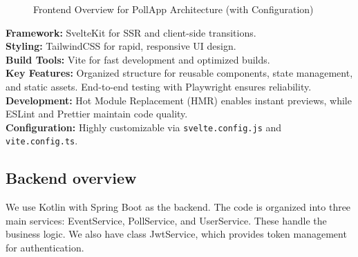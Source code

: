 \begin{figure}[H]
{
}
\caption{Frontend Overview for PollApp Architecture (with Configuration)}
\label{fig:frontend_overview_with_configuration}
\end{figure}



\noindent \textbf{Framework:} SvelteKit for SSR and client-side transitions. \\
\noindent \textbf{Styling:} TailwindCSS for rapid, responsive UI design. \\
\noindent \textbf{Build Tools:} Vite for fast development and optimized builds. \\
\noindent \textbf{Key Features:} Organized structure for reusable components, state management, and static assets. End-to-end testing with Playwright ensures reliability. \\
\noindent \textbf{Development:} Hot Module Replacement (HMR) enables instant previews, while ESLint and Prettier maintain code quality. \\
\noindent  \textbf{Configuration:} Highly customizable via \texttt{svelte.config.js} and \texttt{vite.config.ts}.


\subsection{Backend overview}
We use Kotlin with Spring Boot as the backend. The code is organized into three main services: EventService, PollService, and UserService. These handle the business logic. We also have class JwtService,  which provides token management for authentication.
 
